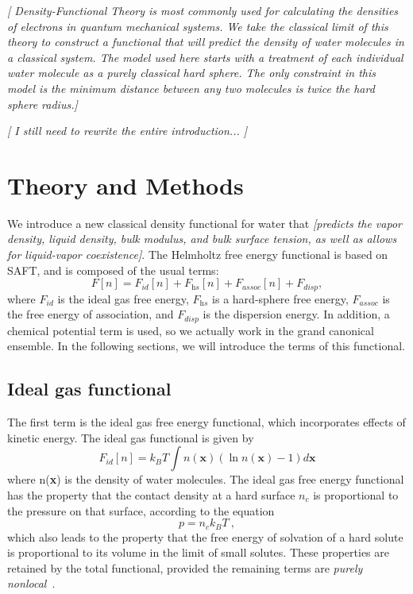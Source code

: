 \documentclass[letterpaper,twocolumn,amsmath,amssymb,prb]{revtex4}
\newcommand{\xx}{\textbf{x}}
\newcommand{\needsworklater}[1]{\emph{[#1]}}
\begin{document}
\needsworklater{
Density-Functional Theory is most commonly used for calculating the
densities of electrons in quantum mechanical systems.  We take the
classical limit of this theory to construct a functional that will predict
the density of water molecules in a classical system.  The model used here
starts with a treatment of each individual water molecule as a purely
classical hard sphere.  The only constraint in this model is
the minimum distance between any two molecules is twice the hard sphere
radius.}

\needsworklater{ I still need to rewrite the entire introduction... }

\section{Theory and Methods}
We introduce a new classical density functional for water that
\needsworklater{predicts the vapor density, liquid density, bulk
  modulus, and bulk surface tension, as well as allows for
  liquid-vapor coexistence}.  The Helmholtz free energy functional is
based on SAFT, and is composed of the usual terms:
\begin{equation}
  F[n] = F_\textit{id}[n] + F_\textit{hs}[n] + F_\textit{assoc}[n] + F_\textit{disp},
\end{equation}
where $F_\textit{id}$ is the ideal gas free energy, $F_\textit{hs}$ is
a hard-sphere free energy, $F_\textit{assoc}$ is the free energy of
association, and $F_\textit{disp}$ is the dispersion energy.  In
addition, a chemical potential term is used, so we actually work in
the grand canonical ensemble.  In the following sections, we will
introduce the terms of this functional.

\subsection{Ideal gas functional}
The first term is the ideal gas free energy functional,
which incorporates effects of kinetic energy.  The ideal gas
functional is given by
\begin{equation}\label{idealgas}
  F_{id}[n] = k_B T \int n(\xx)\left( \ln{n(\xx)} - 1\right) d\xx
\end{equation}
where n(\xx) is the density of water molecules.  The ideal gas free
energy functional has the property that the contact density at a hard
surface $n_c$ is proportional to the pressure on that surface,
according to the equation
\begin{equation}
  p = n_c k_BT \:,
\end{equation}
which also leads to the property that the free energy of solvation of
a hard solute is proportional to its volume in the limit of small
solutes.  These properties are retained by the total functional,
provided the remaining terms are \emph{purely
  nonlocal}~\cite{ashcroft?}.
\end{document}
